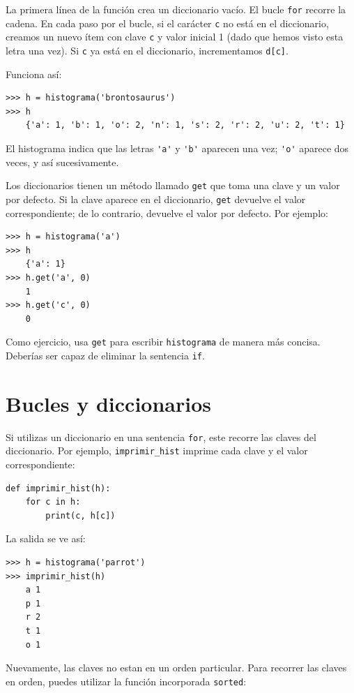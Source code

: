 \documentclass[10pt]{book}
\begin{document}
La primera línea de la
función crea un diccionario vacío.  El bucle {\tt for} recorre
la cadena.  En cada paso por el bucle, si el carácter {\tt c} no
está en el diccionario, creamos un nuevo ítem con clave {\tt c} y
valor inicial 1 (dado que hemos visto esta letra una vez).  Si {\tt c}
ya está en el diccionario, incrementamos {\tt d[c]}.

Funciona así:

\begin{verbatim}
>>> h = histograma('brontosaurus')
>>> h
    {'a': 1, 'b': 1, 'o': 2, 'n': 1, 's': 2, 'r': 2, 'u': 2, 't': 1}
\end{verbatim}
%
El histograma indica que las letras \verb"'a'" y \verb"'b'"
aparecen una vez; \verb"'o'" aparece dos veces, y así sucesivamente.


Los diccionarios tienen un método llamado {\tt get} que toma una clave
y un valor por defecto.  Si la clave aparece en el diccionario,
{\tt get} devuelve el valor correspondiente; de lo contrario, devuelve
el valor por defecto.  Por ejemplo:

\begin{verbatim}
>>> h = histograma('a')
>>> h
    {'a': 1}
>>> h.get('a', 0)
    1
>>> h.get('c', 0)
    0
\end{verbatim}
%
Como ejercicio, usa {\tt get} para escribir {\tt histograma} de manera más concisa.
Deberías ser capaz de eliminar la sentencia {\tt if}.


\section{Bucles y diccionarios}

Si utilizas un diccionario en una sentencia {\tt for}, este recorre
las claves del diccionario.  Por ejemplo, \verb"imprimir_hist"
imprime cada clave y el valor correspondiente:

\begin{verbatim}
def imprimir_hist(h):
    for c in h:
        print(c, h[c])
\end{verbatim}
%
La salida se ve así:

\begin{verbatim}
>>> h = histograma('parrot')
>>> imprimir_hist(h)
    a 1
    p 1
    r 2
    t 1
    o 1
\end{verbatim}
%
Nuevamente, las claves no estan en un orden particular.  Para recorrer las claves
en orden, puedes utilizar la función incorporada {\tt sorted}:
\end{document}
